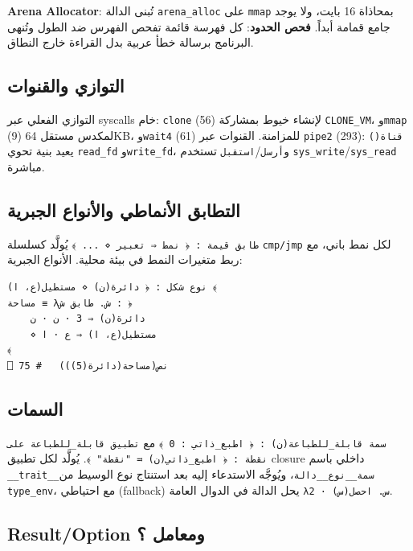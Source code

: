 \documentclass[sigconf]{acmart}
\begin{document}
\textbf{Arena Allocator}: تُبنى الدالة \texttt{arena\_alloc} على \texttt{mmap}
بمحاذاة 16 بايت، ولا يوجد جامع قمامة أبداً. \textbf{فحص الحدود}: كل فهرسة قائمة
تفحص الفهرس ضد الطول وتُنهى البرنامج برسالة خطأ عربية بدل القراءة خارج النطاق.

\subsection{التوازي والقنوات}
\label{sec:design:concurrency}

التوازي الفعلي عبر syscalls خام: \texttt{clone} (56) لإنشاء خيوط بمشاركة
\texttt{CLONE\_VM}، و\texttt{mmap} (9) لمكدس مستقل 64KB، و\texttt{wait4} (61)
للمزامنة. القنوات عبر \texttt{pipe2} (293): \texttt{قناة()} يعيد بنية تحوي
\texttt{read\_fd} و\texttt{write\_fd}، و\texttt{أرسل}/\texttt{استقبل} تستخدم
\texttt{sys\_write}/\texttt{sys\_read} مباشرة.

\subsection{التطابق الأنماطي والأنواع الجبرية}
\label{sec:design:pattern}

\texttt{طابق قيمة : ﴿ نمط ⇒ تعبير ⋄ ... ﴾} يُولَّد كسلسلة \texttt{cmp/jmp} لكل
نمط باني، مع ربط متغيرات النمط في بيئة محلية. الأنواع الجبرية:

\begin{lstlisting}[style=arlang]
نوع شكل : ﴿ دائرة(ن) ⋄ مستطيل(ع، ا) ﴾
مساحة ≡ λش. طابق ش : ﴿
    دائرة(ن) ⇒ 3 · ن · ن
    ⋄ مستطيل(ع، ا) ⇒ ع · ا
﴾
⎕ نص(مساحة(دائرة(5)))   # 75
\end{lstlisting}

\subsection{السمات}
\label{sec:design:traits}

\texttt{سمة قابلة\_للطباعة(ن) : ﴿ اطبع\_ذاتي : 0 ﴾} مع
\texttt{تطبيق قابلة\_للطباعة على نقطة : ﴿ اطبع\_ذاتي(ن) ≔ "نقطة" ﴾}. يُولَّد لكل
تطبيق closure داخلي باسم \texttt{\_\_trait\_\_{سمة}\_\_{نوع}\_\_{دالة}}،
ويُوجَّه الاستدعاء إليه بعد استنتاج نوع الوسيط من \texttt{type\_env}، مع
احتياطي (fallback) يحل الدالة في الدوال العامة \texttt{λس. احصل(س) · 2}.

\subsection{Result/Option ومعامل ؟}
\label{sec:design:result}
\end{document}
